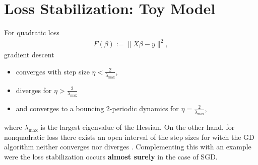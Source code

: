 \section{Loss Stabilization: Toy Model}
For quadratic loss
\begin{align}
F(\beta) := \|X\beta - y\|^{2},
\end{align}
gradient descent
\begin{itemize}
    \item  converges with step size $\eta < \frac{2}{\lambda_{\text{max}}}$,
    \item diverges for $\eta > \frac{2}{\lambda_{\text{max}}}$
    \item  and converges to a bouncing 2-periodic dynamics for $\eta =
        \frac{2}{\lambda_{\text{max}}}$,
\end{itemize}
where $\lambda_{\text{max}}$ is the largest eigenvalue of the Hessian. On the
other hand, for nonquadratic loss there exists an open interval of the step
sizes for witch the GD algorithm neither converges nor diverges
\cite{andriushchenko2023sgd}. Complementing this with an example were the
loss stabilization occurs \textbf{almost surely} in the case of SGD.
\newline

